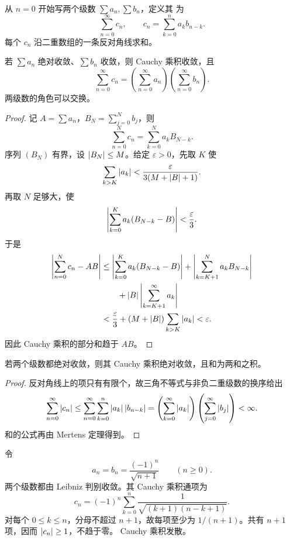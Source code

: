 从 \(n=0\) 开始写两个级数
\(\sum a_n,\sum b_n\)，定义其 为
\[
 \sum_{n=0}^\infty c_n,\qquad
 c_n=\sum_{k=0}^n a_kb_{n-k}.
\]
每个 \(c_n\) 沿二重数组的一条反对角线求和。

\begin{theorem}[Mertens 定理]
\label{thm:mertens-cauchy-product}
若 \(\sum a_n\) 绝对收敛、\(\sum b_n\) 收敛，则 Cauchy 乘积收敛，且
\[
 \sum_{n=0}^\infty c_n
 =\left(\sum_{n=0}^\infty a_n\right)
  \left(\sum_{n=0}^\infty b_n\right).
\]
两级数的角色可以交换。
\end{theorem}

\begin{proof}
记 \(A=\sum a_n\)，\(B_N=\sum_{j=0}^N b_j\)，则
\[
 \sum_{n=0}^N c_n
 =\sum_{k=0}^N a_kB_{N-k}.
\]
序列 \((B_N)\) 有界，设 \(\left|B_N\right|\le M\)。给定
\(\varepsilon>0\)，先取 \(K\) 使
\[
 \sum_{k>K}\left|a_k\right|<\frac{\varepsilon}{3(M+\left|B\right|+1)}.
\]
再取 \(N\) 足够大，使
\[
 \left|\sum_{k=0}^K a_k(B_{N-k}-B)\right|<\frac{\varepsilon}{3}.
\]
于是
\[
\begin{aligned}
 \left|\sum_{n=0}^N c_n-AB\right|
 &\le
 \left|\sum_{k=0}^K a_k(B_{N-k}-B)\right|
 +\left|\sum_{k=K+1}^N a_kB_{N-k}\right|\\
 &\qquad
 +\left|B\right|\left|\sum_{k=K+1}^{\infty}a_k\right|\\
 &<\frac{\varepsilon}{3}
 +(M+\left|B\right|)\sum_{k>K}\left|a_k\right|
 <\varepsilon.
\end{aligned}
\]
因此 Cauchy 乘积的部分和趋于 \(AB\)。
\end{proof}

\begin{corollary}
若两个级数都绝对收敛，则其 Cauchy 乘积绝对收敛，且和为两和之积。
\end{corollary}

\begin{proof}
反对角线上的项只有有限个，故三角不等式与非负二重级数的换序给出
\[
 \sum_{n=0}^\infty\left|c_n\right|
 \le \sum_{n=0}^\infty\sum_{k=0}^n\left|a_k\right|\left|b_{n-k}\right|
 =\left(\sum_{k=0}^\infty\left|a_k\right|\right)
  \left(\sum_{j=0}^\infty\left|b_j\right|\right)<\infty.
\]
和的公式再由 Mertens 定理得到。
\end{proof}

\begin{counterexample}
令
\[
 a_n=b_n=\frac{(-1)^n}{\sqrt{n+1}}\qquad(n\ge0).
\]
两个级数都由 Leibniz 判别收敛。其 Cauchy 乘积通项为
\[
 c_n=(-1)^n\sum_{k=0}^n
 \frac1{\sqrt{(k+1)(n-k+1)}}.
\]
对每个 \(0\le k\le n\)，分母不超过 \(n+1\)，故每项至少为
\(1/(n+1)\)。共有 \(n+1\) 项，因而 \(\left|c_n\right|\ge1\)，不趋于零。
Cauchy 乘积发散。
\end{counterexample}

